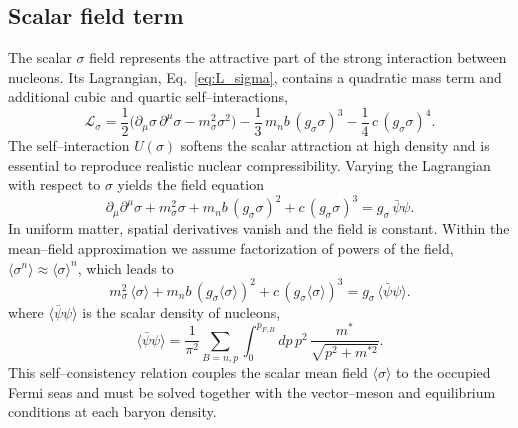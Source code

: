 \subsection*{Scalar field term}
\label{subsec:sigma_term}

The scalar $\sigma$ field represents the attractive part of the strong
interaction between nucleons. Its Lagrangian, Eq.~\eqref{eq:L_sigma}, contains a
quadratic mass term and additional cubic and quartic self–interactions,
\[
\mathcal{L}_{\sigma}
= \frac{1}{2}\bigl(\partial_{\mu}\sigma\,\partial^{\mu}\sigma - m_{\sigma}^{2}\sigma^{2}\bigr)
- \frac{1}{3}\,m_{n}b\,(g_{\sigma}\sigma)^{3}
- \frac{1}{4}\,c\,(g_{\sigma}\sigma)^{4}.
\]
The self–interaction $U(\sigma)$ softens the scalar attraction at high
density and is essential to reproduce realistic nuclear compressibility.
Varying the Lagrangian with respect to $\sigma$ yields the field equation
\begin{equation}
\partial_{\mu}\partial^{\mu}\sigma
+ m_{\sigma}^{2}\sigma
+ m_{n}b\,(g_{\sigma}\sigma)^{2}
+ c\,(g_{\sigma}\sigma)^{3}
= g_{\sigma}\,\bar{\psi}\psi.
\end{equation}
In uniform matter, spatial derivatives vanish and the field is constant.
Within the mean–field approximation we assume factorization of powers of the
field, $\langle\sigma^{n}\rangle \approx \langle\sigma\rangle^{n}$, which leads to
\begin{equation}
m_{\sigma}^{2}\,\langle\sigma\rangle
+ m_{n}b\,(g_{\sigma}\langle\sigma\rangle)^{2}
+ c\,(g_{\sigma}\langle\sigma\rangle)^{3}
= g_{\sigma}\,\langle\bar{\psi}\psi\rangle.
\label{eq:sigma_mf_eq}
\end{equation}
where $\langle\bar{\psi}\psi\rangle$ is the scalar density of nucleons,
\begin{equation}
\langle\bar{\psi}\psi\rangle
= \frac{1}{\pi^{2}}\!\sum_{B=n,p}
  \int_{0}^{p_{F,B}}\!dp\,p^{2}\,
  \frac{m^{*}}{\sqrt{p^{2}+m^{*2}}}.
\label{eq:scalar_density}
\end{equation}
This self–consistency relation couples the scalar mean field $\langle\sigma\rangle$ to the
occupied Fermi seas and must be solved together with the vector–meson and
equilibrium conditions at each baryon density.

